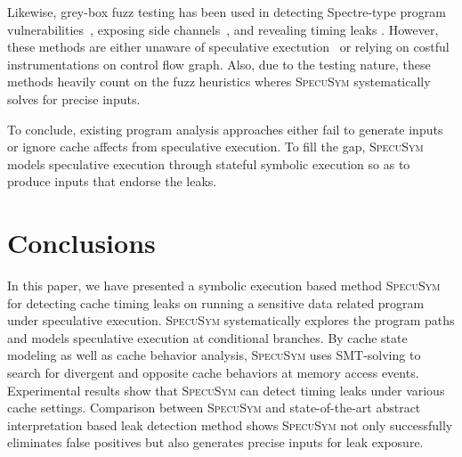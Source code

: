 \documentclass[sigconf]{acmart}
\newcommand{\SpecuSym}{\textsc{SpecuSym} }
\begin{document}
Likewise, grey-box fuzz testing has been used in detecting Spectre-type
\cite{KocherGGHHLMPSY19} program vulnerabilities~\cite{OleksenkoTSF19}, 
exposing side channels~\cite{NilizadehNP19}, and revealing timing leaks
\cite{HeEC19}. However, these methods are either unaware of speculative 
exectution~\cite{NilizadehNP19,HeEC19} or relying on costful 
instrumentations on control flow graph. Also, due to the testing nature, 
these methods heavily count on the fuzz heuristics wheres \SpecuSym 
systematically solves for precise inputs.


To conclude, existing program analysis approaches either fail to 
generate inputs or ignore cache affects from speculative execution. 
To fill the gap, \SpecuSym models speculative execution through 
stateful symbolic execution so as to produce inputs that endorse 
the leaks. 


\section{Conclusions}
\label{sec:conclusion}


In this paper, we have presented a symbolic execution based method 
\SpecuSym for detecting cache timing leaks on running a sensitive data 
related program under speculative execution. \SpecuSym systematically 
explores the program paths and models speculative execution at conditional 
branches. By cache state modeling as well as cache behavior analysis, 
\SpecuSym uses SMT-solving to search for divergent and opposite cache 
behaviors at memory access events. Experimental results show that 
\SpecuSym can detect timing leaks under various cache settings. Comparison 
between \SpecuSym and state-of-the-art abstract interpretation based 
leak detection method shows \SpecuSym not only successfully eliminates 
false positives but also generates precise inputs for leak exposure.


\clearpage\newpage


%

\end{document}
